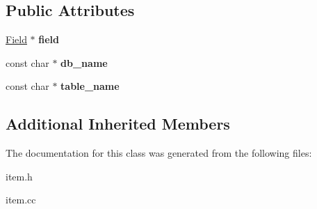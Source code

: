 \subsection*{Public Attributes}
\begin{DoxyCompactItemize}
\item 
\mbox{\label{classItem__ident__for__show_aaa07510c3fcf405ba367f9b7a01680c1}} 
\mbox{\hyperlink{classField}{Field}} $\ast$ {\bfseries field}
\item 
\mbox{\label{classItem__ident__for__show_ae73ba65fcabfd7fcaab69a599e32f7ed}} 
const char $\ast$ {\bfseries db\+\_\+name}
\item 
\mbox{\label{classItem__ident__for__show_a5df121cb7217ef88c186043048b82e1c}} 
const char $\ast$ {\bfseries table\+\_\+name}
\end{DoxyCompactItemize}
\subsection*{Additional Inherited Members}


The documentation for this class was generated from the following files\+:\begin{DoxyCompactItemize}
\item 
item.\+h\item 
item.\+cc\end{DoxyCompactItemize}
